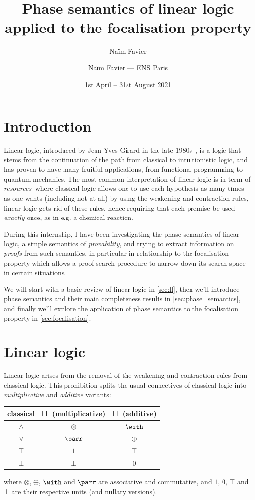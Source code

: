 \documentclass[11pt]{article}
\author{Naïm Favier}
\title{\huge\sc Phase semantics of linear logic applied to the focalisation property}
\author{Naïm Favier --- ENS Paris}
\date{1st April -- 31st August 2021}
\newcommand\LL{\textsf{LL}}
\newcommand\0{\textbf{0}}
\newcommand\1{\textbf{1}}
\begin{document}
\maketitle

\section{Introduction}

{\sc Linear logic}, introduced by Jean-Yves Girard in the late 1980s~\cite{ll}, is a logic that stems from
the continuation of the path from classical to intuitionistic logic,
and has proven to have many fruitful applications, from functional programming to quantum mechanics.
The most common interpretation of linear logic is in term of \emph{resources}: where classical logic allows one to use
each hypothesis as many times as one wants (including not at all) by using the weakening and contraction rules,
linear logic gets rid of these rules, hence requiring that each premise be used \emph{exactly} once, as in e.g. a chemical reaction.

During this internship, I have been investigating the phase semantics of linear logic, a simple semantics
of \emph{provability}, and trying to extract information on \emph{proofs} from such semantics, in particular in relationship
to the focalisation property which allows a proof search procedure to narrow down its search space in certain situations.

We will start with a basic review of linear logic in \cref{sec:ll}, then we'll introduce phase semantics and their main
completeness results in \cref{sec:phase_semantics}, and finally we'll explore the application of phase semantics
to the focalisation property in \cref{sec:focalisation}.

\section{\label{sec:ll}Linear logic}

Linear logic arises from the removal of the weakening and contraction rules from classical logic.
This prohibition splits the usual connectives of classical logic into
\emph{multiplicative} and \emph{additive} variants:
\begin{center}
    \begin{tabular}{c|c|c}
        classical & $\LL$ (multiplicative) & $\LL$ (additive) \\
        \hline
        $\land$ & $\otimes$ & $\with$ \\
        $\lor$ & $\parr$ & $\oplus$ \\
        $\top$ & $1$ & $\top$ \\
        $\bot$ & $\bot$ & $0$
    \end{tabular}
\end{center}
where $\otimes$, $\oplus$, $\with$ and $\parr$ are associative and commutative, and $1$, $0$, $\top$ and $\bot$ are
their respective units (and nullary versions).
\end{document}
